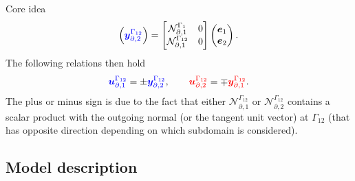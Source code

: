 \documentclass[aspectratio=169]{ISAE-Beamer}
\begin{document}
\begin{frame}{Core idea}
\begin{equation*}
\begin{pmatrix}
\textcolor{blue}{\bm{y}_{\partial, 2}^{\Gamma_{12}}}\\
\end{pmatrix} = \begin{bmatrix}
\mathcal{N}_{\partial, 1}^{\Gamma_1} & 0 \\
\mathcal{N}_{\partial, 1}^{\Gamma_{12}}  & 0 \\
\end{bmatrix} \begin{pmatrix}
\bm{e}_1 \\ \bm{e}_2
\end{pmatrix}.
\end{equation*}
The following relations then hold
\begin{equation*}
\textcolor{blue}{\bm{u}_{\partial, 1}^{\Gamma_{12}}} =\pm \textcolor{blue}{\bm{y}_{\partial, 2}^{\Gamma_{12}}}, \qquad \textcolor{red}{\bm{u}_{\partial, 2}^{\Gamma_{12}}} = \mp \textcolor{red}{\bm{y}_{\partial, 1}^{\Gamma_{12}}}.
\end{equation*}
The plus or minus sign is due to the fact that either $\mathcal{N}_{\partial, 1}^{\Gamma_{12}}$ or $\mathcal{N}_{\partial, 2}^{\Gamma_{12}}$ contains a scalar product with the outgoing normal (or the tangent unit vector) at ${\Gamma_{12}}$ (that has opposite direction depending on which subdomain is considered).
\end{frame}


\subsection{Model description}
\end{document}
